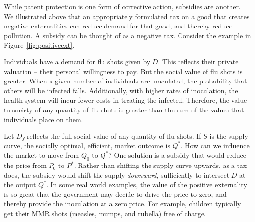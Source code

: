 While patent protection is one form of corrective action, subsidies are another. We illustrated above that an appropriately formulated tax on a good that creates negative externalities can reduce demand for that good, and thereby reduce pollution. A subsidy can be thought of as a negative tax. Consider the example in Figure~\ref{fig:positiveext}.



Individuals have a demand for flu shots given by $D$. This reflects their private valuation -- their personal willingness to pay. But the social value of flu shots is greater. When a given number of individuals are inoculated, the probability that others will be infected falls. Additionally, with higher rates of inoculation, the health system will incur fewer costs in treating the infected. Therefore, the value to society of any quantity of flu shots is greater than the sum of the values that individuals place on them. 

Let $D_f$ reflects the full social value of any quantity of flu shots. If $S$ is the supply curve, the socially optimal, efficient, market outcome is $Q^*$. How can we influence the market to move from $Q_0$ to $Q^*$? One solution is a subsidy that would reduce the price from $P_0$ to $P^*$. Rather than shifting the supply curve upwards, as a tax does, the subsidy would shift the supply \textit{downward}, sufficiently to intersect $D$ at the output $Q^*$. In some real world examples, the value of the positive externality is so great that the government may decide to drive the price to zero, and thereby provide the inoculation at a zero price. For example, children typically get their MMR shots (measles, mumps, and rubella) free of charge.